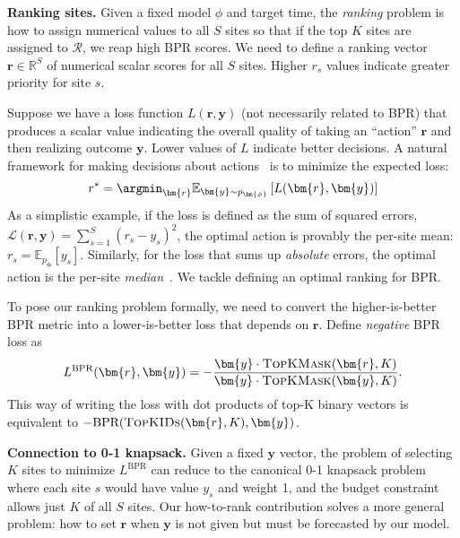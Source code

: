 \textbf{Ranking sites.}
Given a fixed model $\phi$ and target time, the \emph{ranking} problem is how to assign numerical values to all $S$ sites so that if the top $K$ sites are assigned to $\mathcal{R}$, we reap high BPR scores. We need to define a ranking vector $\bm{r} \in \mathbb{R}^S$ of numerical scalar scores for all $S$ sites. Higher $r_s$ values indicate greater priority for site $s$. 


Suppose we have a loss function $L(\bm{r}, \bm{y})$ (not necessarily related to BPR) that 
produces a scalar value 
indicating the overall quality of taking an ``action'' $\bm{r}$ and then realizing outcome $\bm{y}$.
Lower values of $L$ indicate better decisions.
A natural framework for making decisions about actions~\citep{murphy2022Sec5_1DecisionTheory} is to minimize the expected loss:
\begin{align}
    r^* = \argmin_{\bm{r}} \mathbb{E}_{\bm{y} \sim p_{\bm{\phi}}} \left[ L( \bm{r}, \bm{y} )
    \right]
\end{align}
As a simplistic example, if the loss is defined as the sum of squared errors, $\mathcal{L}( \bm{r}, \bm{y}) = \sum_{s=1}^S (r_s - y_s)^2$, the optimal action is provably the per-site mean: $r_s = \mathbb{E}_{p_{\bm{\phi}}}[ y_s ]$. Similarly, for the loss that sums up \emph{absolute} errors, the optimal action is the per-site \emph{median}~\citep{schwertman1990MedianProof,proofMedianMinimizesMAE}. We tackle defining an optimal ranking for BPR.

To pose our ranking problem formally, we need to convert the higher-is-better BPR metric into a lower-is-better loss that depends on $\bm{r}$. Define \emph{negative} BPR loss as
\begin{align}
   L^{\text{BPR}}(\bm{r}, \bm{y})
    =  - \frac{
    \bm{y} \cdot \textsc{TopKMask}(\bm{r}, K)
    }{
    \bm{y} \cdot \textsc{TopKMask}(\bm{y}, K)    
    }.
    \label{eq:loss_bpr_how_to_rank}
\end{align}
This way of writing the loss with dot products of top-K binary vectors is equivalent to $-\text{BPR}( \textsc{TopKIDs}(\bm{r},K), \bm{y} )$.

\textbf{Connection to 0-1 knapsack.} Given a fixed $\bm{y}$ vector, the problem of selecting $K$ sites to minimize $L^{\text{BPR}}$ can reduce to the canonical 0-1 knapsack problem \cite{dantzigDiscreteVariableExtremumProblems1957} where each site $s$ would have value $y_s$ and weight 1, and the budget constraint allows just $K$ of all $S$ sites. Our how-to-rank contribution solves a more general problem: how to set $\bm{r}$ when $\bm{y}$ is not given but must be forecasted by our model.

